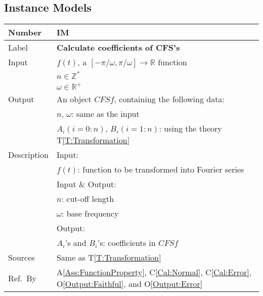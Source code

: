 \documentclass[12pt]{article}
\newcommand{\colAwidth}{0.13\textwidth}
\newcommand{\colBwidth}{0.82\textwidth}
\newcommand{\tref}[1]{T\ref{#1}}
\newcommand{\aref}[1]{A\ref{#1}}
\newcommand{\calref}[1]{C\ref{#1}}
\newcommand{\oref}[1]{O\ref{#1}}
\newcounter{instnum} %
\begin{document}
\subsection{Instance Models}
\noindent
\begin{minipage}{\textwidth}
	\renewcommand*{\arraystretch}{1.5}
	\begin{tabular}{| p{\colAwidth} | p{\colBwidth}|}
		\hline
		\rowcolor[gray]{0.9}
		Number& IM{instnum}\theinstnum 
		\label{IM:CFScoeff}\\
		\hline
		Label& \bf Calculate coefficients of CFS's\\
		\hline
		Input& $f(t)$, a $[-\pi/\omega, \pi/\omega]
		\rightarrow\mathbb{R}$ function\\
			& $n\in\mathbb{Z}^{*}$\\
			& $\omega\in\mathbb{R}^{+}$\\
		\hline
		Output& An object $\mathit{CFSf}$, containing the 
		following data:\\
		&$n$, $\omega$: same as the input\\
		&$A_i (i=0:n)$, $B_i (i=1:n)$: using the theory 
		\tref{T:Transformation}\\
		\hline
		Description&Input:\\
		&$f(t)$: function to be transformed into 
		Fourier series\\
		&Input \& Output:\\
		& $n$: cut-off length\\
		& $\omega$: base frequency\\
		&Output:\\
		&$A_i$'s and $B_i$'s: coefficients in $\mathit{CFSf}$\\
		\hline
		Sources&Same as \tref{T:Transformation}		\\
		\hline
		Ref.\ By & \aref{Ass:FunctionProperty}, 
		\calref{Cal:Normal}, \calref{Cal:Error}, 
		\oref{Output:Faithful}, and \oref{Output:Error}\\
		\hline
	\end{tabular}
\end{minipage}\\
~\newline
\noindent
\end{document}
